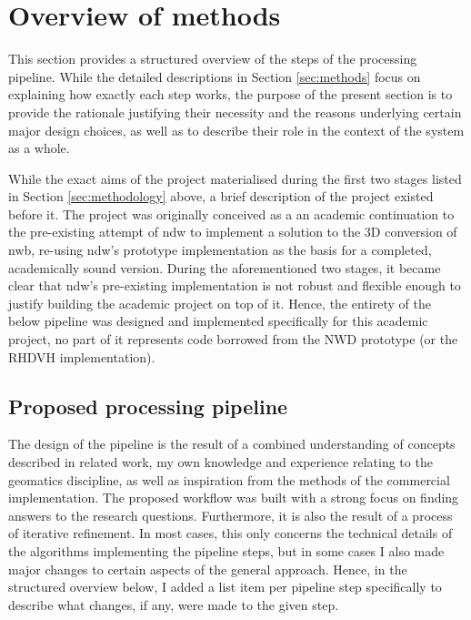 \section{Overview of methods}
\label{sec:methodsoverview}

This section provides a structured overview of the steps of the processing pipeline. While the detailed descriptions in Section \ref{sec:methods} focus on explaining how exactly each step works, the purpose of the present section is to provide the rationale justifying their necessity and the reasons underlying certain major design choices, as well as to describe their role in the context of the system as a whole.

While the exact aims of the project materialised during the first two stages listed in Section \ref{sec:methodology} above, a brief description of the project existed before it. The project was originally conceived as a an academic continuation to the pre-existing attempt of \ac{ndw} to implement a solution to the 3D conversion of \ac{nwb}, re-using \ac{ndw}'s prototype implementation as the basis for a completed, academically sound version. During the aforementioned two stages, it became clear that \ac{ndw}'s pre-existing implementation is not robust and flexible enough to justify building the academic project on top of it. Hence, the entirety of the below pipeline was designed and implemented specifically for this academic project, no part of it represents code borrowed from the NWD prototype (or the RHDVH implementation).

\subsection{Proposed processing pipeline}
\label{sub:pipelineoverview}

The design of the pipeline is the result of a combined understanding of concepts described in related work, my own knowledge and experience relating to the geomatics discipline, as well as inspiration from the methods of the commercial implementation. The proposed workflow was built with a strong focus on finding answers to the research questions. Furthermore, it is also the result of a process of iterative refinement. In most cases, this only concerns the technical details of the algorithms implementing the pipeline steps, but in some cases I also made major changes to certain aspects of the general approach. Hence, in the structured overview below, I added a list item per pipeline step specifically to describe what changes, if any, were made to the given step.


